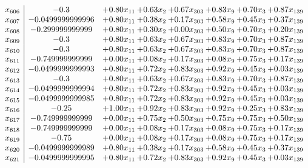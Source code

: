 \documentclass[8pt]{article}
\begin{document}
\[\begin{array}{c| c c@{\hskip 2pt} c@{\hskip 2pt} c@{\hskip 2pt} c@{\hskip 2pt} c@{\hskip 2pt} c@{\hskip 2pt} }
 x_{606}   &  -0.3 & +  0.80 x_{11} & +  0.63 x_{2} & +  0.67 x_{303} & +  0.83 x_{9} & +  0.70 x_{3} & +  0.87 x_{139}\\
 x_{607}   &  -0.0499999999996 & +  0.80 x_{11} & +  0.38 x_{2} & +  0.17 x_{303} & +  0.58 x_{9} & +  0.45 x_{3} & +  0.37 x_{139}\\
 x_{608}   &  -0.299999999999 & +  0.80 x_{11} & +  0.30 x_{2} & +  0.00 x_{303} & +  0.50 x_{9} & +  0.70 x_{3} & +  0.20 x_{139}\\
 x_{609}   &  -0.3 & +  0.80 x_{11} & +  0.63 x_{2} & +  0.67 x_{303} & +  0.83 x_{9} & +  0.70 x_{3} & +  0.87 x_{139}\\
 x_{610}   &  -0.3 & +  0.80 x_{11} & +  0.63 x_{2} & +  0.67 x_{303} & +  0.83 x_{9} & +  0.70 x_{3} & +  0.87 x_{139}\\
 x_{611}   &  -0.749999999999 & +  0.00 x_{11} & +  0.08 x_{2} & +  0.17 x_{303} & +  0.08 x_{9} & +  0.75 x_{3} & +  0.17 x_{139}\\
 x_{612}   &  -0.0499999999993 & +  0.80 x_{11} & +  0.72 x_{2} & +  0.83 x_{303} & +  0.92 x_{9} & +  0.45 x_{3} & +  0.03 x_{139}\\
 x_{613}   &  -0.3 & +  0.80 x_{11} & +  0.63 x_{2} & +  0.67 x_{303} & +  0.83 x_{9} & +  0.70 x_{3} & +  0.87 x_{139}\\
 x_{614}   &  -0.0499999999994 & +  0.80 x_{11} & +  0.72 x_{2} & +  0.83 x_{303} & +  0.92 x_{9} & +  0.45 x_{3} & +  0.03 x_{139}\\
 x_{615}   &  -0.0499999999985 & +  0.80 x_{11} & +  0.72 x_{2} & +  0.83 x_{303} & +  0.92 x_{9} & +  0.45 x_{3} & +  0.03 x_{139}\\
 x_{616}   &  -0.25 & +  1.00 x_{11} & +  0.92 x_{2} & +  0.83 x_{303} & +  0.92 x_{9} & +  0.25 x_{3} & +  0.83 x_{139}\\
 x_{617}   &  -0.749999999999 & +  0.00 x_{11} & +  0.75 x_{2} & +  0.50 x_{303} & +  0.75 x_{9} & +  0.75 x_{3} & +  0.50 x_{139}\\
 x_{618}   &  -0.749999999999 & +  0.00 x_{11} & +  0.08 x_{2} & +  0.17 x_{303} & +  0.08 x_{9} & +  0.75 x_{3} & +  0.17 x_{139}\\
 x_{619}   &  -0.75 & +  0.00 x_{11} & +  0.08 x_{2} & +  0.17 x_{303} & +  0.08 x_{9} & +  0.75 x_{3} & +  0.17 x_{139}\\
 x_{620}   &  -0.0499999999989 & +  0.80 x_{11} & +  0.38 x_{2} & +  0.17 x_{303} & +  0.58 x_{9} & +  0.45 x_{3} & +  0.37 x_{139}\\
 x_{621}   &  -0.0499999999995 & +  0.80 x_{11} & +  0.72 x_{2} & +  0.83 x_{303} & +  0.92 x_{9} & +  0.45 x_{3} & +  0.03 x_{139}\\

\end{array}\]
\end{document}
